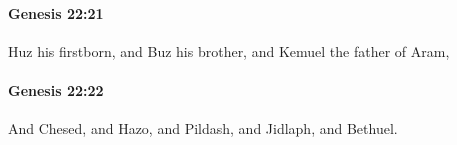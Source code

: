 		\paragraph{Genesis 22:21} %
			\label{GENESIS-22-21}

			Huz his firstborn, and Buz his brother, and Kemuel the father of Aram,


		\paragraph{Genesis 22:22} %
			\label{GENESIS-22-22}

			And Chesed, and Hazo, and Pildash, and Jidlaph, and Bethuel.


